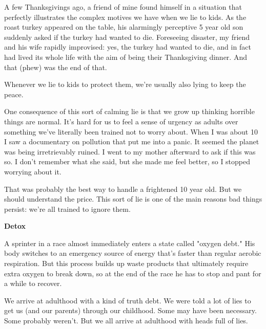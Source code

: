 A few Thanksgivings ago, a friend of mine found
                  himself in a situation that perfectly illustrates the complex
                  motives we have when we lie to kids. As the roast turkey
                  appeared on the table, his alarmingly perceptive 5 year old
                  son suddenly asked if the turkey had wanted to die. Foreseeing
                  disaster, my friend and his wife rapidly improvised: yes, the
                  turkey had wanted to die, and in fact had lived its whole life
                  with the aim of being their Thanksgiving dinner. And that
                  (phew) was the end of that.

Whenever we lie to kids
                  to protect them, we're usually also lying to keep the
                  peace.

One consequence of this sort of calming lie
                  is that we grow up thinking horrible things are normal. It's
                  hard for us to feel a sense of urgency as adults over
                  something we've literally been trained not to worry about.
                  When I was about 10 I saw a documentary on pollution that put
                  me into a panic. It seemed the planet was being irretrievably
                  ruined. I went to my mother afterward to ask if this was so. I
                  don't remember what she said, but she made me feel better, so
                  I stopped worrying about it.

That was probably the
                  best way to handle a frightened 10 year old. But we should
                  understand the price. This sort of lie is one of the main
                  reasons bad things persist: we're all trained to ignore
                  them.


                  \textbf{Detox}

A sprinter in a race almost
                  immediately enters a state called "oxygen debt." His body
                  switches to an emergency source of energy that's faster than
                  regular aerobic respiration. But this process builds up waste
                  products that ultimately require extra oxygen to break down,
                  so at the end of the race he has to stop and pant for a while
                  to recover.

We arrive at adulthood with a kind of
                  truth debt. We were told a lot of lies to get us (and our
                  parents) through our childhood. Some may have been necessary.
                  Some probably weren't. But we all arrive at adulthood with
                  heads full of lies.

